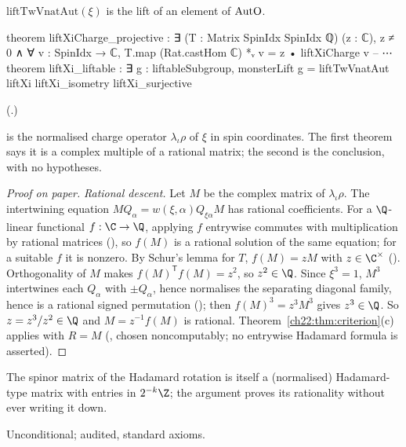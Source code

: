 \begin{theorem}[$\xi$ lifts]\label{ch22:thm:xi}
$\mathrm{liftTwVnatAut}(\xi)$ is the lift of an element of $\mathrm{AutO}$.
\end{theorem}
\begin{leancode}
theorem liftXiCharge_projective :
    ∃ (T : Matrix SpinIdx SpinIdx ℚ) (z : ℂ), z ≠ 0 ∧
      ∀ v : SpinIdx → ℂ, T.map (Rat.castHom ℂ) *ᵥ v = z • liftXiCharge v
-- ⋯
theorem liftXi_liftable : ∃ g : liftableSubgroup,
    monsterLift g = liftTwVnatAut liftXi liftXi_isometry liftXi_surjective
\end{leancode}
(.)
\begin{dictionary}
 is the normalised charge operator $\lambda_\iota\rho$ of $\xi$ in spin coordinates.  The first theorem says it
is a complex multiple of a rational matrix; the second is the conclusion, with no hypotheses.
\end{dictionary}
\begin{proof}[Proof on paper]
\emph{Rational descent.}  Let $M$ be the complex matrix of $\lambda_\iota\rho$.  The intertwining equation
$MQ_\alpha=w(\xi,\alpha)Q_{\xi\alpha}M$ has rational coefficients.  For a $\Q$-linear functional $f:\C\to\Q$, applying $f$
entrywise commutes with multiplication by rational matrices (), so $f(M)$ is a rational
solution of the same equation; for a suitable $f$ it is nonzero.  By Schur's lemma for $T$, $f(M)=zM$ with
$z\in\C^\times$ ().  Orthogonality of $M$ makes $f(M)^{\mathsf T}f(M)=z^2$, so
$z^2\in\Q$.  Since $\xi^3=1$, $M^3$ intertwines each $Q_\alpha$ with $\pm Q_\alpha$, hence normalises the separating diagonal
family, hence is a rational signed permutation (); then $f(M)^3=z^3M^3$ gives
$z^3\in\Q$.  So $z=z^3/z^2\in\Q$ and $M=z^{-1}f(M)$ is rational.  Theorem~\ref{ch22:thm:criterion}(c) applies with
$R=M$ (, chosen noncomputably; no entrywise Hadamard formula is asserted).
\end{proof}
\begin{physics}
The spinor matrix of the Hadamard rotation is itself a (normalised) Hadamard-type matrix with entries in
$2^{-k}\Z$; the argument proves its rationality without ever writing it down.
\end{physics}
\begin{status}Unconditional; audited, standard axioms.\end{status}

